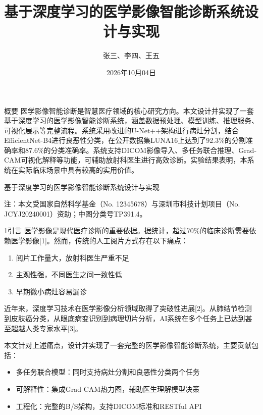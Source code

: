 \documentclass{harryopo-slides}
\title[基于深度学习的医学影像智能诊断系统设计与实现]{基于深度学习的医学影像智能诊断系统设计与实现}
\author{张三、李四、王五}
\institute{示例大学 计算机学院；南方科技大学 计算机科学与工程系}
\date{2026年10月04日}
\begin{document}
\begin{frame}[plain]
\titlepage
\end{frame}

\begin{frame}{概要}
医学影像智能诊断是智慧医疗领域的核心研究方向。本文设计并实现了一套基于深度学习的医学影像智能诊断系统，涵盖数据预处理、模型训练、推理服务、可视化展示等完整流程。系统采用改进的U-Net++架构进行病灶分割，结合EfficientNet-B4进行良恶性分类，在公开数据集LUNA16上达到了92.3\%的分割准确率和87.6\%的分类准确率。系统支持DICOM影像导入、多任务联合推理、Grad-CAM可视化解释等功能，可辅助放射科医生进行高效诊断。实验结果表明，本系统在实际临床场景中具有较高的实用价值。
\end{frame}

\begin{frame}{基于深度学习的医学影像智能诊断系统设计与实现}
\begin{block}{}
注：本文受国家自然科学基金（No. 12345678）与深圳市科技计划项目（No. JCYJ20240001）资助；中图分类号TP391.4。
\end{block}
\end{frame}

\begin{frame}{1引言}
医学影像是现代医疗诊断的重要依据。据统计，超过70\%的临床诊断需要依赖医学影像[1]。然而，传统的人工阅片方式存在以下痛点：

\begin{enumerate}
  \item 阅片工作量大，放射科医生严重不足
  \item 主观性强，不同医生之间一致性低
  \item 早期微小病灶容易漏诊
\end{enumerate}
近年来，深度学习技术在医学影像分析领域取得了突破性进展[2]。从肺结节检测到皮肤癌分类，从眼底病变识别到病理切片分析，AI系统在多个任务上已达到甚至超越人类专家水平[3]。

本文针对上述痛点，设计并实现了一套完整的医学影像智能诊断系统，主要贡献包括：

\begin{itemize}
  \item {\fzht 多任务联合模型}：同时支持病灶分割和良恶性分类两个任务
  \item {\fzht 可解释性}：集成Grad-CAM热力图，辅助医生理解模型决策
  \item {\fzht 工程化}：完整的B/S架构，支持DICOM标准和RESTful API
\end{itemize}
\end{frame}
\end{document}
